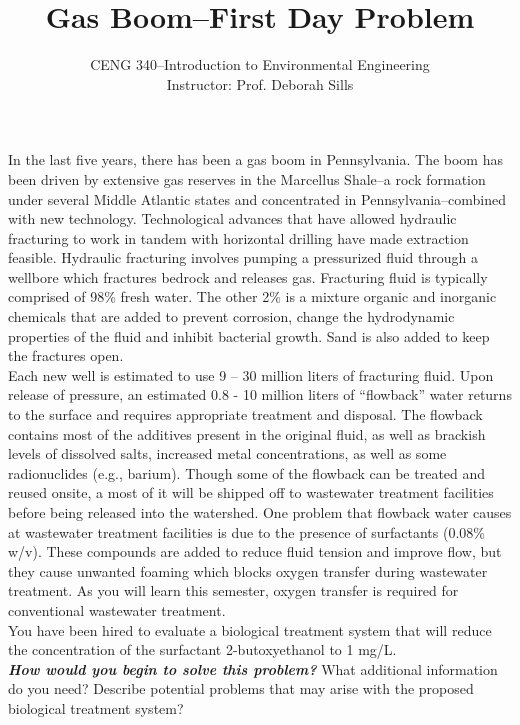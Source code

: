 \documentclass[12pt,letterpaper]{article}
\begin{document}
\setlength{\parindent}{0cm} 


\frenchspacing

\title {Gas Boom--First Day Problem} 
\author {CENG 340--Introduction to Environmental Engineering\\
Instructor: Prof. Deborah Sills}
\maketitle
In the last five years, there has been a gas boom in Pennsylvania. The boom has been driven by extensive gas reserves in the Marcellus Shale--a rock formation under several Middle Atlantic states and concentrated in Pennsylvania--combined with new technology. Technological advances that have allowed hydraulic fracturing to work in tandem with horizontal drilling have made extraction feasible. Hydraulic fracturing involves pumping a pressurized fluid through a wellbore which fractures bedrock and releases gas. Fracturing fluid is typically comprised of 98\% fresh water. The other 2\% is a mixture organic and inorganic chemicals that are added to prevent corrosion, change the hydrodynamic properties of the fluid and inhibit bacterial growth. Sand is also added to keep the fractures open.\\

Each new well is estimated to use 9 – 30 million liters of fracturing fluid. Upon release of pressure, an estimated 0.8 - 10 million liters of “flowback” water returns to the surface and requires appropriate treatment and disposal. The flowback contains most of the additives present in the original fluid, as well as brackish levels of dissolved salts, increased metal concentrations, as well as some radionuclides (e.g., barium). Though some of the flowback can be treated and reused onsite, a most of it will be shipped off to wastewater treatment facilities before being released into the watershed. One problem that flowback water causes at wastewater treatment facilities is due to the presence of surfactants (0.08\% w/v).  These compounds are added to reduce fluid tension and improve flow, but they cause unwanted foaming which blocks oxygen transfer during wastewater treatment.  As you will learn this semester, oxygen transfer is required for conventional wastewater treatment.\\

You have been hired to evaluate a biological treatment system that will reduce the concentration of the surfactant 2-butoxyethanol to 1 mg/L.\\

\textbf{ \emph{How would you begin to solve this problem?}}  What additional information do you need?  Describe potential problems that may arise with the proposed biological treatment system?  
\end{document}
